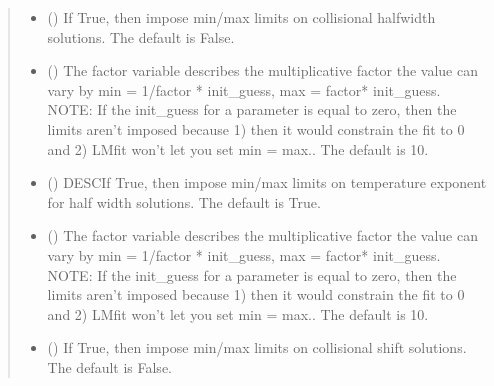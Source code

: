 \documentclass[letterpaper,10pt,english]{sphinxmanual}
\begin{document}
\begin{fulllineitems}
\begin{quote}
\begin{description}
\begin{itemize}
\item {} 
\sphinxAtStartPar
{} (\sphinxstyleliteralemphasis{\sphinxupquote{, }}) \textendash{} If True, then impose min/max limits on collisional half\sphinxhyphen{}width solutions. The default is False.

\item {} 
\sphinxAtStartPar
{} (\sphinxstyleliteralemphasis{\sphinxupquote{, }}) \textendash{} The factor variable describes the multiplicative factor the value can vary by min = 1/factor * init\_guess, max = factor* init\_guess. NOTE: If the init\_guess for a parameter is equal to zero, then the limits aren’t imposed because 1) then it would constrain the fit to 0 and 2) LMfit won’t let you set min = max.. The default is 10.

\item {} 
\sphinxAtStartPar
{} (\sphinxstyleliteralemphasis{\sphinxupquote{, }}) \textendash{} DESCIf True, then impose min/max limits on temperature exponent for half width solutions. The default is True.

\item {} 
\sphinxAtStartPar
{} (\sphinxstyleliteralemphasis{\sphinxupquote{, }}) \textendash{} The factor variable describes the multiplicative factor the value can vary by min = 1/factor * init\_guess, max = factor* init\_guess. NOTE: If the init\_guess for a parameter is equal to zero, then the limits aren’t imposed because 1) then it would constrain the fit to 0 and 2) LMfit won’t let you set min = max.. The default is 10.

\item {} 
\sphinxAtStartPar
{} (\sphinxstyleliteralemphasis{\sphinxupquote{, }}) \textendash{} If True, then impose min/max limits on collisional shift solutions. The default is False.


\end{itemize}
\end{description}
\end{quote}
\end{fulllineitems}
\end{document}
